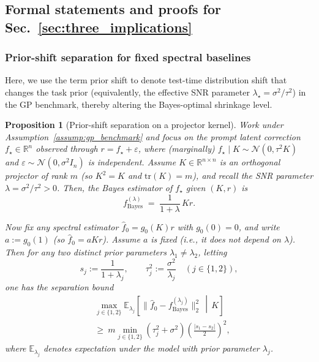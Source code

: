 \documentclass{article}
\theoremstyle{plain}
\newtheorem{proposition}[theorem]{Proposition}
\theoremstyle{definition}
\theoremstyle{remark}
\begin{document}
\subsection{Formal statements and proofs for Sec.~\ref{sec:three_implications}}
\label{app:three_implications}

\subsubsection{Prior-shift separation for fixed spectral baselines}
\label{app:prior_shift_sep_rigorous}

Here, we use the term prior shift to denote test-time distribution shift that changes the task prior (equivalently, the effective SNR parameter $\lambda_\star=\sigma^2/\tau^2$) in the GP benchmark, thereby altering the Bayes-optimal shrinkage level.

\begin{proposition}[Prior-shift separation on a projector kernel]
\label{thm:app_prior_shift_separation}
Work under Assumption~\ref{assump:gp_benchmark} and focus on the prompt latent correction $f_\star\in\mathbb R^n$
observed through $r=f_\star+\varepsilon$, where (marginally) $f_\star\mid K\sim\mathcal N(0,\tau^2 K)$ and
$\varepsilon\sim\mathcal N(0,\sigma^2 I_n)$ is independent.
Assume $K\in\mathbb{R}^{n\times n}$ is an orthogonal projector of rank $m$ (so $K^2=K$ and $\mathrm{tr}(K)=m$),
and recall the SNR parameter $\lambda=\sigma^2/\tau^2>0$.
Then, the Bayes estimator of $f_\star$ given $(K,r)$ is
\[
    f_{\mathrm{Bayes}}^{(\lambda)} \;=\; \frac{1}{1+\lambda}\,K r.
\]

Now fix any spectral estimator $\hat f_0=g_0(K)r$ with $g_0(0)=0$, and write $a:=g_0(1)$ (so $\hat f_0=aKr$).
Assume $a$ is fixed (i.e., it does not depend on $\lambda$).
Then for any two distinct prior parameters $\lambda_1\neq \lambda_2$, letting
\[
     s_j:=\frac{1}{1+\lambda_j},\qquad \tau_j^2:=\frac{\sigma^2}{\lambda_j}\quad (j\in\{1,2\}),
\]
one has the separation bound
\begin{align*}
&     \max_{j\in\{1,2\}} \mathbb E_{\lambda_j}\!\left[\bigl\|\hat f_0-f_{\mathrm{Bayes}}^{(\lambda_j)}\bigr\|_2^2 \,\middle|\, K\right] \\
& \ge\ m  \min_{j\in\{1,2\}}(\tau_j^2+\sigma^2)\left(\frac{|s_1-s_2|}{2}\right)^2,
\end{align*}
where $\mathbb E_{\lambda_j}$ denotes expectation under the model with prior parameter $\lambda_j$.
\end{proposition}
\end{document}
